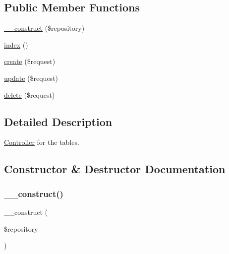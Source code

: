 \subsection*{Public Member Functions}
\begin{DoxyCompactItemize}
\item 
\mbox{\hyperlink{class_app_1_1_http_1_1_controllers_1_1_table_controller_a5b75ba6bc9debb999c0186a31978ec03}{\+\_\+\+\_\+construct}} (\$repository)
\item 
\mbox{\hyperlink{class_app_1_1_http_1_1_controllers_1_1_table_controller_a149eb92716c1084a935e04a8d95f7347}{index}} ()
\item 
\mbox{\hyperlink{class_app_1_1_http_1_1_controllers_1_1_table_controller_a4fa811c83f27da01b0d92bdb2a711a13}{create}} (\$request)
\item 
\mbox{\hyperlink{class_app_1_1_http_1_1_controllers_1_1_table_controller_ab7b27a90191560dcef32126b0945db0d}{update}} (\$request)
\item 
\mbox{\hyperlink{class_app_1_1_http_1_1_controllers_1_1_table_controller_a126a3799c44d72393ca4732081306dfd}{delete}} (\$request)
\end{DoxyCompactItemize}


\subsection{Detailed Description}
\mbox{\hyperlink{class_app_1_1_http_1_1_controllers_1_1_controller}{Controller}} for the tables. 

\subsection{Constructor \& Destructor Documentation}
\mbox{\label{class_app_1_1_http_1_1_controllers_1_1_table_controller_a5b75ba6bc9debb999c0186a31978ec03}} 
\subsubsection{\texorpdfstring{\+\_\+\+\_\+construct()}{\_\_construct()}}
{\footnotesize\ttfamily \+\_\+\+\_\+construct (\begin{DoxyParamCaption}\item[{}]{\$repository }\end{DoxyParamCaption})}

